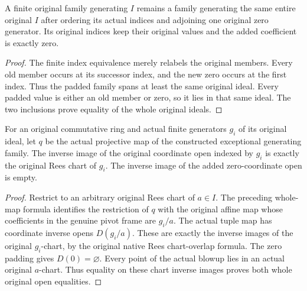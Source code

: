 \begin{lemma}
\leanok
\label{lem:kn-nadel-nef-big-padded-ideal-generators}
A finite original family generating $I$ remains a family generating the
same entire original $I$ after ordering its actual indices and adjoining
one original zero generator. Its original indices keep their original
values and the added coefficient is exactly zero.
\end{lemma}
\begin{proof}
The finite index equivalence merely relabels the original members. Every
old member occurs at its successor index, and the new zero occurs at the
first index. Thus the padded family spans at least the same original ideal.
Every padded value is either an old member or zero, so it lies in that
same ideal. The two inclusions prove equality of the whole original ideals.
\end{proof}

\begin{lemma}
\leanok
\label{lem:kn-nadel-nef-big-exact-coordinate-preimages}
For an original commutative ring and actual finite generators $g_i$ of its
original ideal, let $q$ be the actual projective map of the constructed
exceptional generating family. The inverse image of the original coordinate
open indexed by $g_i$ is exactly the original Rees chart of $g_i$. The
inverse image of the added zero-coordinate open is empty.
\end{lemma}
\begin{proof}
Restrict to an arbitrary original Rees chart of $a\in I$. The preceding
whole-map formula identifies the restriction of $q$ with the original affine
map whose coefficients in the genuine pivot frame are $g_i/a$. The actual
tuple map has coordinate inverse opens $D(g_i/a)$. These are exactly the
inverse images of the original $g_i$-chart, by the original native Rees
chart-overlap formula. The zero padding gives $D(0)=\varnothing$. Every
point of the actual blowup lies in an actual original $a$-chart. Thus equality
on these chart inverse images proves both whole original open equalities.
\end{proof}

